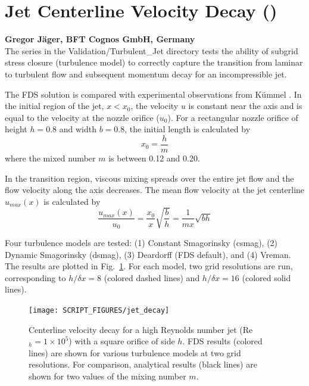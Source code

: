 \documentclass[11pt]{book}
\begin{document}
\clearpage


\section{Jet Centerline Velocity Decay (\texorpdfstring{}{jet})}

\textbf{Gregor J\"ager, BFT Cognos GmbH, Germany}\\

\noindent The  series in the Validation/Turbulent\_Jet directory tests the ability of subgrid stress closure (turbulence model) to correctly capture the transition from laminar to turbulent flow and subsequent momentum decay for an incompressible jet.

The FDS solution is compared with experimental observations from K\"ummel \cite{Kummel:2007}. In the initial region of the jet, $x<x_0$, the velocity $u$ is constant near the axis and is equal to the velocity at the nozzle orifice ($u_0$). For a rectangular nozzle orifice of height $h = 0.8$ and width $b = 0.8$, the initial length is calculated by
\begin{equation}
x_0 = \frac{h}{m}
\end{equation}
where the mixed number $m$ is between 0.12 and 0.20.

In the transition region, viscous mixing spreads over the entire jet flow and the flow velocity along the axis decreases. The mean flow velocity at the jet centerline $u_{max}(x)$ is calculated by
\begin{equation}
\frac{u_{max}(x)}{u_0} = \frac{x_0}{x}\sqrt{\frac{b}{h}} = \frac{1}{mx} \sqrt{bh}
\end{equation}

Four turbulence models are tested: (1) Constant Smagorinsky (csmag), (2) Dynamic Smagorinsky (dsmag), (3) Deardorff (FDS default), and (4) Vreman.  The results are plotted in Fig.~\ref{fig_jet_decay}. For each model, two grid resolutions are run, corresponding to $h/\delta x = 8$ (colored dashed lines) and $h/\delta x=16$ (colored solid lines).
\begin{figure}[h]
\centering
\texttt{[image: SCRIPT\_FIGURES/jet\_decay]}
\caption[Jet centerline velocity decay]{Centerline velocity decay for a high Reynolds number jet (Re$_h = 1 \times 10^5$) with a square orifice of side $h$.  FDS results (colored lines) are shown for various turbulence models at two grid resolutions.  For comparison, analytical results (black lines) are shown for two values of the mixing number $m$.}
\label{fig_jet_decay}
\end{figure}
\end{document}
